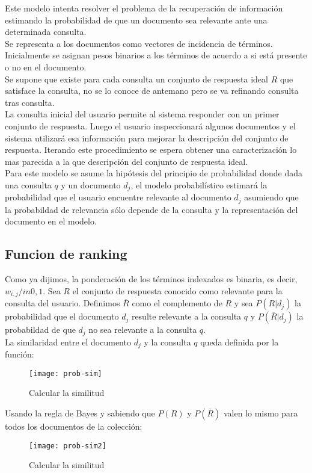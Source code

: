 Este modelo intenta resolver el problema de la recuperación de información estimando la probabilidad de que un documento sea relevante ante una determinada consulta.\\
Se representa a los documentos como vectores de incidencia de términos. Inicialmente se asignan pesos binarios a los términos de acuerdo a si está presente o no en el documento.\\
Se supone que existe para cada consulta un conjunto de respuesta ideal $R$ que satisface la consulta, no se lo conoce de antemano pero se va refinando consulta tras consulta.\\
La consulta inicial del usuario permite al sistema responder con un primer conjunto de respuesta. Luego el usuario inspeccionará algunos documentos y el sistema utilizará esa información para mejorar la descripción del conjunto de respuesta. Iterando este procedimiento se espera obtener una caracterización lo mas parecida a la que descripción del conjunto de respuesta ideal.\\
Para este modelo se asume la hipótesis del principio de probabilidad donde dada una consulta $q$ y un documento $d_{j}$, el modelo probabilístico estimará la probabilidad que el usuario encuentre relevante al documento $d_{j}$ asumiendo que la probabildad de relevancia sólo depende de la consulta y la representación del documento en el modelo.\\

\subsection{Funcion de ranking}

Como ya dijimos, la ponderación de los términos indexados es binaria, es decir, $w_{i,j} /in {0,1}$.
Sea $R$ el conjunto de respuesta conocido como relevante para la consulta del usuario. Definimos $\overline{R}$ como el complemento de $R$ y sea $P(R|d_{j})$ la probabilidad que el documento $d_{j}$ resulte relevante a la consulta $q$ y $P(\overline{R}|d_{j})$ la probabildad de que $d_{j}$ no sea relevante a la consulta $q$.\\
La similaridad entre el documento $d_{j}$ y la consulta $q$ queda definida por la función:
			\begin{figure}[h]
					\texttt{[image: prob-sim]}
					\centering
					\caption{Calcular la similitud}
				\end{figure}
				
Usando la regla de Bayes y sabiendo que $P(R)$ y $P(\overline{R})$ valen lo mismo para todos los documentos de la colección:
			\begin{figure}[h]
					\texttt{[image: prob-sim2]}
					\centering
					\caption{Calcular la similitud}
				\end{figure}
				



